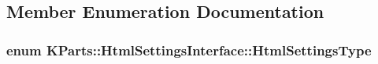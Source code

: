 \subsection{Member Enumeration Documentation}
\hypertarget{classKParts_1_1HtmlSettingsInterface_a62e44360376f423604c5c838ec0e312f}{
\subsubsection[{Html\+Settings\+Type}]{\setlength{\rightskip}{0pt plus 5cm}enum {\bf K\+Parts\+::\+Html\+Settings\+Interface\+::\+Html\+Settings\+Type}}}\label{classKParts_1_1HtmlSettingsInterface_a62e44360376f423604c5c838ec0e312f}
